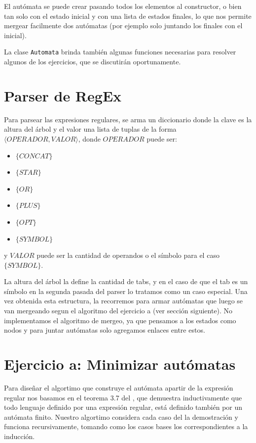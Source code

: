 \documentclass{article}
\begin{document}
El autómata se puede crear pasando todos los elementos al constructor, o bien tan solo con el estado inicial y con una lista de estados finales, lo que nos permite mergear facilmente dos autómatas (por ejemplo solo juntando los finales con el inicial).

La clase \texttt{Automata} brinda también algunas funciones necesarias para resolver algunos de los ejercicios, que se discutirán oportunamente.

\section*{Parser de RegEx}

Para parsear las expresiones regulares, se arma un diccionario donde la clave es la altura del árbol y el valor una lista de tuplas de la forma $\langle OPERADOR, VALOR \rangle$, donde $OPERADOR$ puede ser:
\begin{itemize}
\item $\{CONCAT\}$
\item $\{STAR\}$
\item $\{OR\}$
\item $\{PLUS\}$
\item $\{OPT\}$ 
\item $\{SYMBOL\}$
\end{itemize}

\noindent 
y $VALOR$ puede ser la cantidad de operandos o el símbolo para el caso $\{SYMBOL\}$.


La altura del árbol la define la cantidad de tabs, y en el caso de que el tab es un símbolo en la segunda pasada del parser lo tratamos como un caso especial.  Una vez obtenida esta estructura, la recorremos para armar autómatas que luego se van mergeando segun el algoritmo del ejercicio a (ver sección siguiente).  No implementamos el algoritmo de mergeo, ya que pensamos a los estados como nodos y para juntar autómatas solo agregamos enlaces entre estos.


\section*{Ejercicio a: Minimizar autómatas}

Para diseñar el algortimo que construye el autómata apartir de la expresión regular nos basamos en el teorema 3.7 del \Hopcroft, que demuestra inductivamente que todo lenguaje definido por una expresión regular, está definido también por un autómata finito.  Nuestro algortimo considera cada caso del la demostración y funciona recursivamente, tomando como los casos bases los correspondientes a la inducción. 
\end{document}
